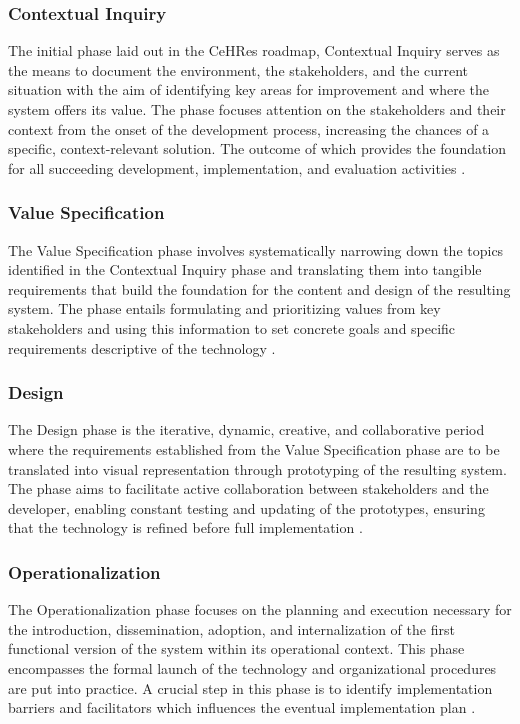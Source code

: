 \documentclass[11pt,a4paper,titlepage]{article}
\begin{document}
	\subsubsection{Contextual Inquiry}
	The initial phase laid out in the CeHRes roadmap, Contextual Inquiry serves as the means to document the environment, the stakeholders, and the current situation with the aim of identifying key areas for improvement and where the system offers its value. The phase focuses attention on the stakeholders and their context from the onset of the development process, increasing the chances of a specific, context-relevant solution. The outcome of which provides the foundation for all succeeding development, implementation, and evaluation activities \cite{Kip2025CeHRes}.
	
	\subsubsection{Value Specification}
	The Value Specification phase involves systematically narrowing down the topics identified in the Contextual Inquiry phase and translating them into tangible requirements that build the foundation for the content and design of the resulting system. The phase entails formulating and prioritizing values from key stakeholders and using this information to set concrete goals and specific requirements descriptive of the technology \cite{Kip2025CeHRes}. 

	\subsubsection{Design}
	The Design phase is the iterative, dynamic, creative, and collaborative period where the requirements established from the Value Specification phase are to be translated into visual representation through prototyping of the resulting system. The phase aims to facilitate active collaboration between stakeholders and the developer, enabling constant testing and updating of the prototypes, ensuring that the technology is refined before full implementation \cite{Kip2025CeHRes}.
	
	\subsubsection{Operationalization}
	The Operationalization phase focuses on the planning and execution necessary for the introduction, dissemination, adoption, and internalization of the first functional version of the system within its operational context. This phase encompasses the formal launch of the technology and organizational procedures are put into practice. A crucial step in this phase is to identify implementation barriers and facilitators which influences the eventual implementation plan \cite{Kip2025CeHRes}.
	
\end{document}
